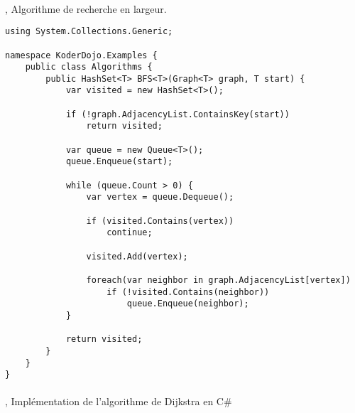 \paragraph{} \cite{Algorithm1}, Algorithme de recherche en largeur.

\begin{lstlisting}
using System.Collections.Generic;

namespace KoderDojo.Examples {
    public class Algorithms {
        public HashSet<T> BFS<T>(Graph<T> graph, T start) {
            var visited = new HashSet<T>();

            if (!graph.AdjacencyList.ContainsKey(start))
                return visited;
                
            var queue = new Queue<T>();
            queue.Enqueue(start);

            while (queue.Count > 0) {
                var vertex = queue.Dequeue();

                if (visited.Contains(vertex))
                    continue;

                visited.Add(vertex);

                foreach(var neighbor in graph.AdjacencyList[vertex])
                    if (!visited.Contains(neighbor))
                        queue.Enqueue(neighbor);
            }

            return visited;
        }
    }
}
\end{lstlisting}

\paragraph{} \cite{Algorithm3}, Implémentation de l'algorithme de Dijkstra en C\#

